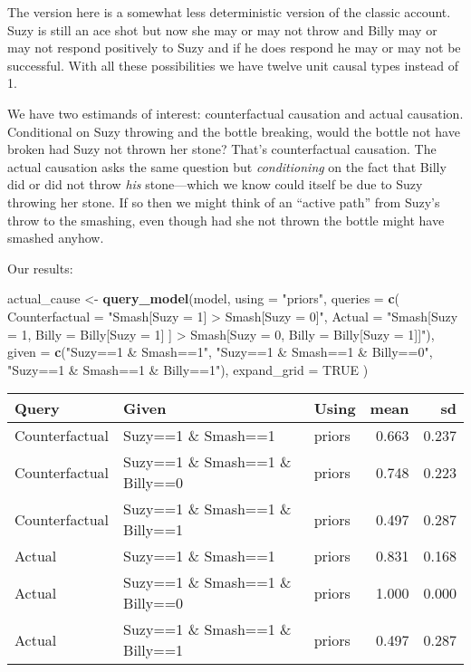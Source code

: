 \documentclass[
  12pt,
]{book}
\newenvironment{Shaded}{\begin{snugshade}}{\end{snugshade}}
\newcommand{\DataTypeTok}[1]{\textcolor[rgb]{0.13,0.29,0.53}{#1}}
\newcommand{\KeywordTok}[1]{\textcolor[rgb]{0.13,0.29,0.53}{\textbf{#1}}}
\newcommand{\NormalTok}[1]{#1}
\newcommand{\OtherTok}[1]{\textcolor[rgb]{0.56,0.35,0.01}{#1}}
\newcommand{\StringTok}[1]{\textcolor[rgb]{0.31,0.60,0.02}{#1}}
\begin{document}
The version here is a somewhat less deterministic version of the classic account. Suzy is still an ace shot but now she may or may not throw and Billy may or may not respond positively to Suzy and if he does respond he may or may not be successful. With all these possibilities we have twelve unit causal types instead of 1.

We have two estimands of interest: counterfactual causation and actual causation. Conditional on Suzy throwing and the bottle breaking, would the bottle not have broken had Suzy not thrown her stone? That's counterfactual causation. The actual causation asks the same question but \emph{conditioning} on the fact that Billy did or did not throw \emph{his} stone---which we know could itself be due to Suzy throwing her stone. If so then we might think of an ``active path'' from Suzy's throw to the smashing, even though had she not thrown the bottle might have smashed anyhow.

Our results:

\begin{Shaded}
\begin{Highlighting}[]
\NormalTok{actual_cause <-}\StringTok{ }\KeywordTok{query_model}\NormalTok{(model, }\DataTypeTok{using =} \StringTok{"priors"}\NormalTok{,}
  \DataTypeTok{queries =} \KeywordTok{c}\NormalTok{(}
    \DataTypeTok{Counterfactual =} \StringTok{"Smash[Suzy = 1] > Smash[Suzy = 0]"}\NormalTok{,}
    \DataTypeTok{Actual =} \StringTok{"Smash[Suzy = 1, Billy = Billy[Suzy = 1] ] > }
\StringTok{              Smash[Suzy = 0, Billy = Billy[Suzy = 1]]"}\NormalTok{),}
  \DataTypeTok{given =} \KeywordTok{c}\NormalTok{(}\StringTok{"Suzy==1 & Smash==1"}\NormalTok{, }\StringTok{"Suzy==1 & Smash==1 & Billy==0"}\NormalTok{, }\StringTok{"Suzy==1 & Smash==1 & Billy==1"}\NormalTok{),}
  \DataTypeTok{expand_grid =} \OtherTok{TRUE}
\NormalTok{  )}
\end{Highlighting}
\end{Shaded}

\begin{tabular}{l|l|l|r|r}
\hline
Query & Given & Using & mean & sd\\
\hline
Counterfactual & Suzy==1 \& Smash==1 & priors & 0.663 & 0.237\\
\hline
Counterfactual & Suzy==1 \& Smash==1 \& Billy==0 & priors & 0.748 & 0.223\\
\hline
Counterfactual & Suzy==1 \& Smash==1 \& Billy==1 & priors & 0.497 & 0.287\\
\hline
Actual & Suzy==1 \& Smash==1 & priors & 0.831 & 0.168\\
\hline
Actual & Suzy==1 \& Smash==1 \& Billy==0 & priors & 1.000 & 0.000\\
\hline
Actual & Suzy==1 \& Smash==1 \& Billy==1 & priors & 0.497 & 0.287\\
\hline
\end{tabular}
\end{document}

